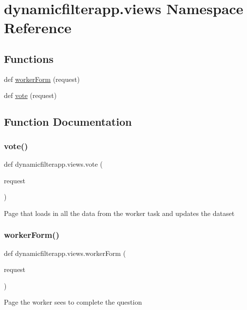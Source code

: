\hypertarget{namespacedynamicfilterapp_1_1views}{}\section{dynamicfilterapp.\+views Namespace Reference}
\label{namespacedynamicfilterapp_1_1views}
\subsection*{Functions}
\begin{DoxyCompactItemize}
\item 
def \hyperlink{namespacedynamicfilterapp_1_1views_a41bd6e65140c4010e5aa8332ac5737ca}{worker\+Form} (request)
\item 
def \hyperlink{namespacedynamicfilterapp_1_1views_a0b8356871afd7c5f24877793011b773c}{vote} (request)
\end{DoxyCompactItemize}


\subsection{Function Documentation}
\mbox{\label{namespacedynamicfilterapp_1_1views_a0b8356871afd7c5f24877793011b773c}} 
\subsubsection{\texorpdfstring{vote()}{vote()}}
{\footnotesize\ttfamily def dynamicfilterapp.\+views.\+vote (\begin{DoxyParamCaption}\item[{}]{request }\end{DoxyParamCaption})}

\begin{DoxyVerb}Page that loads in all the data from the worker task and updates the dataset
\end{DoxyVerb}
 \mbox{\label{namespacedynamicfilterapp_1_1views_a41bd6e65140c4010e5aa8332ac5737ca}} 
\subsubsection{\texorpdfstring{worker\+Form()}{workerForm()}}
{\footnotesize\ttfamily def dynamicfilterapp.\+views.\+worker\+Form (\begin{DoxyParamCaption}\item[{}]{request }\end{DoxyParamCaption})}

\begin{DoxyVerb}Page the worker sees to complete the question
\end{DoxyVerb}
 
